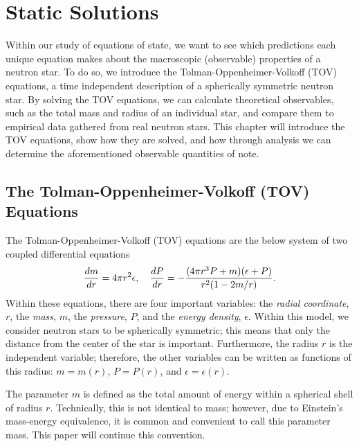 \chapter{Static Solutions}\label{ch: static solutions}

Within our study of equations of state, we want to see which predictions each unique equation makes about the macroscopic (observable) properties of a neutron star. To do so, we introduce the Tolman-Oppenheimer-Volkoff (TOV) equations, a time independent description of a spherically symmetric neutron star. By solving the TOV equations, we can calculate theoretical observables, such as the total mass and radius of an individual star, and compare them to empirical data gathered from real neutron stars. This chapter will introduce the TOV equations, show how they are solved, and how through analysis we can determine the aforementioned observable quantities of note.

\section{The Tolman-Oppenheimer-Volkoff (TOV) Equations}

The Tolman-Oppenheimer-Volkoff (TOV) equations are the below system of two coupled differential equations
\begin{align}\label{eqn: tov}
    \dv{m}{r} = 4\pi r^2 \epsilon, \quad \dv{P}{r} = -\frac{(4\pi r^3 P + m)(\epsilon + P)}{r^2 (1-2m/r)}.
\end{align}
Within these equations, there are four important variables: the \textit{radial coordinate}, $r$, the \textit{mass}, $m$, the \textit{pressure}, $P$, and the \textit{energy density}, $\epsilon$. Within this model, we consider neutron stars to be spherically symmetric; this means that only the distance from the center of the star is important. Furthermore, the radius $r$ is the independent variable; therefore, the other variables can be written as functions of this radius: $m=m(r)$, $P=P(r)$, and $\epsilon=\epsilon(r)$.

The parameter $m$ is defined as the total amount of energy within a spherical shell of radius $r$. Technically, this is not identical to mass; however, due to Einstein's mass-energy equivalence, it is common and convenient to call this parameter mass. This paper will continue this convention. 

